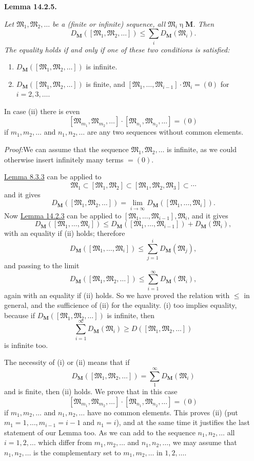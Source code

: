 \documentclass[12pt,b5paper,twoside]{article}
\newcommand{\M}{\mathbf M}
\newcommand{\Lemma}[1]{%
  \par\smallskip\noindent\phantomsection\label{lem:#1}\textbf{Lemma #1.}\enspace
}
\newcommand{\Proof}{\par\noindent\textit{Proof:}\enspace}
\newcommand{\lemref}[1]{\hyperref[lem:#1]{Lemma #1}}
\begin{document}
\Lemma{14.2.5}
{\itshape Let \(\mathfrak M_1,\mathfrak M_2,\ldots\) be a (finite or
infinite) sequence, all \(\mathfrak M_i\mathbin\eta\M\). Then
\[
D_{\M}([\mathfrak M_1,\mathfrak M_2,\ldots])
 \leq\sum_iD_{\M}(\mathfrak M_i).
\]
The equality holds if and only if one of these two conditions is satisfied:
\begin{enumerate}[label=(\roman*)]
\item \(D_{\M}([\mathfrak M_1,\mathfrak M_2,\ldots])\) is infinite.
\item \(D_{\M}([\mathfrak M_1,\mathfrak M_2,\ldots])\) is finite, and
\([\mathfrak M_1,\ldots,\mathfrak M_{i-1}]\cdot\mathfrak M_i=(0)\) for
\(i=2,3,\ldots\).
\end{enumerate}
In case (ii) there is even
\[
[\mathfrak M_{m_1},\mathfrak M_{m_2},\ldots]
 \cdot[\mathfrak M_{n_1},\mathfrak M_{n_2},\ldots]=(0)
\]
if \(m_1,m_2,\ldots\) and \(n_1,n_2,\ldots\) are any two sequences without
common elements.}

\Proof We can assume that the sequence
\(\mathfrak M_1,\mathfrak M_2,\ldots\) is infinite, as we could otherwise
insert infinitely many terms \(=(0)\).

\lemref{8.3.3} can be applied to
\[
\mathfrak M_1\subset[\mathfrak M_1,\mathfrak M_2]
\subset[\mathfrak M_1,\mathfrak M_2,\mathfrak M_3]\subset\cdots
\]
and it gives
\[
D_{\M}([\mathfrak M_1,\mathfrak M_2,\ldots])
=\lim_{i\to\infty}D_{\M}([\mathfrak M_1,\ldots,\mathfrak M_i]).
\]
Now \lemref{14.2.3} can be applied to
\([\mathfrak M_1,\ldots,\mathfrak M_{i-1}],\mathfrak M_i\), and it gives
\[
D_{\M}([\mathfrak M_1,\ldots,\mathfrak M_i])
\leq D_{\M}([\mathfrak M_1,\ldots,\mathfrak M_{i-1}])
 +D_{\M}(\mathfrak M_i),
\]
with an equality if (ii) holds; therefore
\[
D_{\M}([\mathfrak M_1,\ldots,\mathfrak M_i])
 \leq\sum_{j=1}^{i}D_{\M}(\mathfrak M_j),
\]
and passing to the limit
\[
D_{\M}([\mathfrak M_1,\mathfrak M_2,\ldots])
 \leq\sum_{i=1}^{\infty}D_{\M}(\mathfrak M_i),
\]
again with an equality if (ii) holds. So we have proved the relation with
 \(\leq\) in general, and the sufficience of (ii) for the equality. (i) too
implies equality, because if
\(D_{\M}([\mathfrak M_1,\mathfrak M_2,\ldots])\) is infinite, then
\[
\sum_{i=1}^{\infty}D_{\M}(\mathfrak M_i)
 \geq D([\mathfrak M_1,\mathfrak M_2,\ldots])
\]
is infinite too.

The necessity of (i) or (ii) means that if
\[
D_{\M}([\mathfrak M_1,\mathfrak M_2,\ldots])
=\sum_1^\infty D_{\M}(\mathfrak M_i)
\]
and is finite, then (ii) holds. We prove that in this case
\[
[\mathfrak M_{m_1},\mathfrak M_{m_2},\ldots]
 \cdot[\mathfrak M_{n_1},\mathfrak M_{n_2},\ldots]=(0)
\]
if \(m_1,m_2,\ldots\) and \(n_1,n_2,\ldots\) have no common elements.
This proves (ii) (put \(m_1=1,\ldots,m_{i-1}=i-1\) and \(n_1=i\)), and at
the same time it justifies the last statement of our Lemma too. As we can add
to the sequence \(n_1,n_2,\ldots\) all \(i=1,2,\ldots\) which differ from
\(m_1,m_2,\ldots\) and \(n_1,n_2,\ldots\), we may assume that
\(n_1,n_2,\ldots\) is the complementary set to \(m_1,m_2,\ldots\) in
\(1,2,\ldots\).
\end{document}
